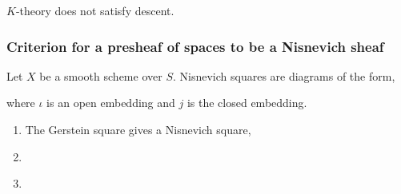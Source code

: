 \documentclass[12pt]{article}
\begin{document}
$K$-theory does not satisfy \etale descent. 

\subsubsection{Criterion for a presheaf of spaces to be a Nisnevich sheaf}

\begin{defn}
Let $X$ be a smooth scheme over $S$. Nisnevich squares are diagrams of the form,
\begin{center}
\end{center}
where $\iota$ is an open embedding and $j$ is the closed embedding. 
\end{defn}

\begin{example}
\begin{enumerate}
\item 
The Gerstein square gives a Nisnevich square,
\begin{center}
\end{center}

\item 

\begin{center}
\end{center}

\item 
\end{enumerate}
\end{example}
\end{document}
